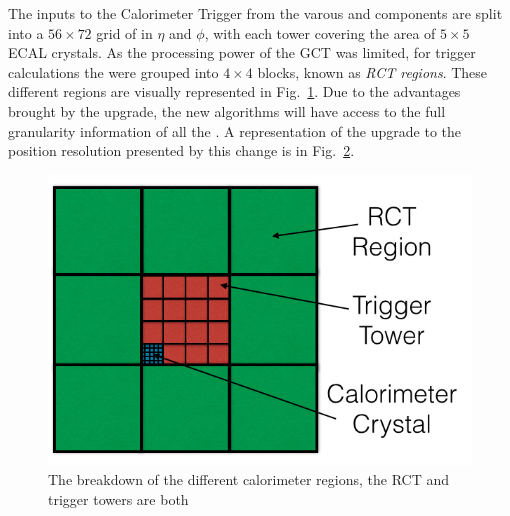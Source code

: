 The inputs to the Calorimeter Trigger from the varous \ECAL and \HCAL
components are split into a $56\times 72$ grid of \TT in $\eta$ and
$\phi$, with each tower covering the area of $5\times5$ ECAL crystals.
As the processing power of the \ac{GCT} was limited, for trigger
calculations the \TT were grouped into $4\times4$ blocks, known as
\emph{RCT regions}. These different regions are visually represented
in Fig.~\ref{fig:trigger_calorimeter}. Due to the advantages brought
by the upgrade, the new algorithms will have access to the full
granularity information of all the \TT. A representation of the
upgrade to the position resolution presented by this change is in
Fig.~\ref{fig:sunnyJim}.

\begin{figure}
	\begin{center}
		\includegraphics[width=0.4\linewidth]{figs/trigger/trigger_calorimeter}
	\end{center}
	\caption{The breakdown of the different calorimeter regions, the RCT
  and trigger towers are both }
	\label{fig:trigger_calorimeter}
\end{figure}

\begin{figure}[!t]
  \centering
  ~ 
   \\
  \caption{}
  \label{fig:sunnyJim}
\end{figure}

